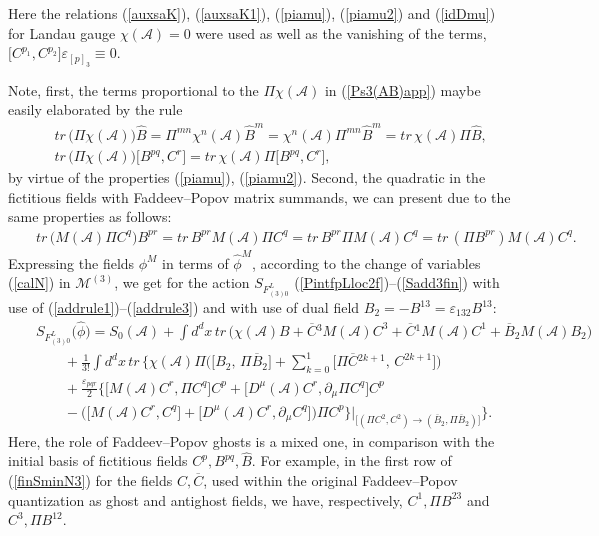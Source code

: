\documentclass[10pt]{article}
\begin{document}
Here the relations (\ref{auxsaK}), (\ref{auxsaK1}),  (\ref{piamu}), (\ref{piamu2}) and (\ref{idDmu})  for Landau gauge $\chi(\mathcal{A})=0$ were used as well as the vanishing of the terms, $\big[C^{p_1},C^{p_2}\big] \varepsilon_{[p]_3} \equiv 0$.


Note, first, the  terms proportional to the $\Pi\chi(\mathcal{A})$  in (\ref{Ps3(AB)app}) maybe easily elaborated by the rule
\begin{eqnarray}\label{addrule1}
&& tr\,\big(\Pi \chi(\mathcal{A})\big)\widehat{B} =  \Pi^{mn} \chi^n(\mathcal{A}) \widehat{B}^m = \chi^n(\mathcal{A})\Pi^{mn} \widehat{B}^m =  tr\, \chi(\mathcal{A})\Pi\widehat{B},\\
  \label{addrule2}
&& tr\,\big(\Pi \chi(\mathcal{A})\big)  \big[B^{pq}, C^r\big] = tr\, \chi(\mathcal{A})  \Pi\big[B^{pq}, C^r\big] ,
\end{eqnarray}
by virtue of the properties (\ref{piamu}), (\ref{piamu2}). Second,  the  quadratic in the fictitious  fields with Faddeev--Popov matrix summands,  we can present due to the same properties as follows:
\begin{eqnarray}\label{addrule3}
&& tr\, \big( {M}(\mathcal{A}) \Pi C^q \big)  B^{pr}  = tr\, B^{pr} {M}(\mathcal{A}) \Pi C^q = tr\, B^{pr} \Pi {M}(\mathcal{A})  C^q =tr\, (\Pi B^{pr}) {M}(\mathcal{A})  C^q.
\end{eqnarray}
Expressing the fields $\phi^M$ in terms of $\widehat{\phi}^M$, according to the change of variables (\ref{calN}) in $\mathcal{M}^{(3)}$, we get for the action $S_{F^L_{(3)0}}$ (\ref{PintfpLloc2f})--(\ref{Sadd3fin}) with use of (\ref{addrule1})--(\ref{addrule3})  and with use of dual field $B_2 =  - B^{13}=\varepsilon_{132}B^{13}$:
\begin{eqnarray}
  && S_{F^L_{(3)0}}\big(\widehat{\phi}\big)  = S_0(\mathcal{A}) + \int d^d x\, tr\,     \Big(  \chi(\mathcal{A}){B}     +
    \overline{C}{}^3 {M}(\mathcal{A})  C^3 +\overline{C}{}^1 {M}(\mathcal{A})  C^1+ \overline{B}_2{M}(\mathcal{A}) B_2 \Big) \nonumber\\
&&  \qquad
+ \frac{1}{3!}\int d^dx \,tr\, \Bigg\{   \chi(\mathcal{A})\Pi \Big( \big[B_2,\,\Pi \overline{B}_2\big] +\sum_{k=0}^1\big[\Pi \overline{C}{}^{2k+1},\, C^{2k+1}\big] \Big) \nonumber\\
&& \qquad+\frac{\varepsilon_{pqr}}{2}\Big\{   \big[{M}(\mathcal{A})C^r, \Pi C^{q}\big]  C^{p}+ \big[D^\mu(\mathcal{A})C^r, \partial_\mu \Pi C^{q}\big]  C^{p}
\nonumber\\
&& \qquad
  -\Big(\big[{M}(\mathcal{A})C^r, C^{q}\big]+ \big[D^\mu(\mathcal{A})C^r, \partial_\mu C^{q}\big]\Big)\Pi  C^{p}\Big\} \Big|_{\big[(\Pi C^2, C^2) \to ( \overline{B}_2, \Pi \overline{B}_2)\big]} \Bigg\}. \label{finSminN3}%
\end{eqnarray}
Here, the role of Faddeev--Popov ghosts is a mixed one, in comparison
with the initial basis of fictitious fields $C^p, B^{pq}, \widehat{B}$.
For example, in the first  row of (\ref{finSminN3}) for the fields $C, \overline{C}$,
used within the original Faddeev--Popov  quantization  as ghost and antighost fields, we have,
respectively, $C^{1}, \Pi{B}^{ 23}$ and $C^{3}, \Pi{B}^{12}$.
\end{document}
